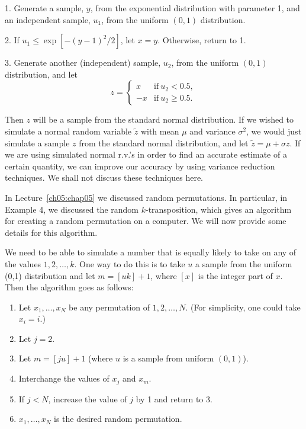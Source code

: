 \documentclass{stml-l}
\theoremstyle{definition}
\numberwithin{equation}{chapter}
\numberwithin{figure}{chapter}
\numberwithin{figure}{section}
\begin{document}
1. Generate a sample, $y$, from the exponential distribution with parameter 1, and an independent sample, $u_{1}$, from the uniform $(0,1)$ distribution.

2. If $u_{1}\leq\exp[-(y-1)^{2}/2]$, let $x=y$. Otherwise, return to
1.

3. Generate another (independent) sample, $u_{2}$, from the uniform
$(0,1)$ distribution, and let
\begin{equation*}
z=\left\{\begin{array}{ll}
x & \mathrm{if}\ u_{2}<0.5,\\
-x & \mathrm{if}\ u_{2}\geq 0.5.
\end{array}\right.
\end{equation*}

Then $z$ will be a sample from the standard normal distribution. If
we wished to simulate a normal random variable $\tilde{z}$ with mean
$\mu$ and variance $\sigma^{2}$, we would just simulate a sample $z$
from the standard normal distribution, and let $\tilde{z}=\mu+\sigma
z$. If we are using simulated normal r.v.'s in order to find an
accurate estimate of a certain quantity, we can improve our accuracy
by using variance reduction techniques. We shall not discuss these
techniques here.

In Lecture~\ref{ch05:chap05} we discussed random permutations. In
particular, in Example 4, we discussed the random $k$-transposition,
which gives an algorithm for creating a random permutation on a
computer. We will now provide some details for this algorithm.

We need to be able to simulate a number that is equally likely to
take on any of the values $1,2,\ldots,k$. One way to do this is to
take $u$ a sample from the uniform (0,1) distribution and let
$m=[uk]+1$, where $[x]$ is the integer part of $x$. Then the
algorithm goes as follows:
\begin{enumerate}
\item Let $x_{1},\ldots,x_{N}$ be any permutation of $1,2,\ldots,N$. (For simplicity, one could take $x_{i}=i.$)
\item Let $j=2$.
\item Let $m=[ju]+1$ (where $u$ is a sample from uniform $(0,1)$).
\item Interchange the values of $x_{j}$ and $x_{m}$.
\item If $j<N$, increase the value of $j$ by 1 and return to 3.
\item $x_{1},\ldots,x_{N}$ is the desired random permutation.
\end{enumerate}
\end{document}

